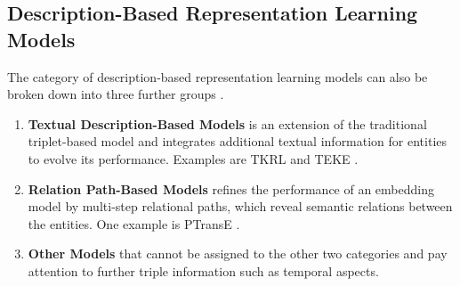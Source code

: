 \subsection{Description-Based Representation Learning Models}
\label{subsec:description_based_representation_learning_models}

The category of description-based representation learning models can also be broken down into three further groups \cite{electronics9050750}.
\begin{enumerate}
    \item 
    \textbf{Textual Description-Based Models} is an extension of the traditional triplet-based model and integrates additional textual information for entities to evolve its performance.
    Examples are \ac{TKRL} \cite{TKRL} and \ac{TEKE} \cite{TEKE}.
    
    \item 
    \textbf{Relation Path-Based Models} refines the performance of an embedding model by multi-step relational paths, which reveal semantic relations between the entities.
    One example is \ac{PTransE} \cite{PTransE}.
    
    \item 
    \textbf{Other Models} that cannot be assigned to the other two categories and pay attention to further triple information such as temporal aspects.
\end{enumerate}